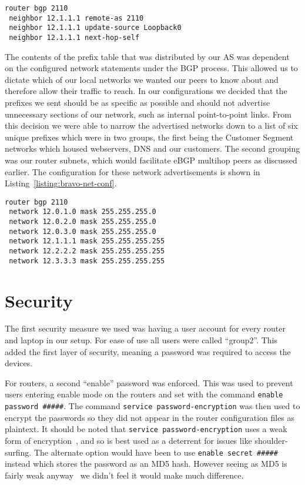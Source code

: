 \begin{lstlisting}[caption={Bravo-Alpha iBGP Configuration}, label={listing:bravo-ibgp-conf}]
router bgp 2110
 neighbor 12.1.1.1 remote-as 2110
 neighbor 12.1.1.1 update-source Loopback0
 neighbor 12.1.1.1 next-hop-self
\end{lstlisting}

The contents of the prefix table that was distributed by our AS was dependent
on the configured network statements under the BGP process. This allowed us to
dictate which of our local networks we wanted our peers to know about and
therefore allow their traffic to reach. In our configurations we decided that
the prefixes we sent should be as specific as possible and should not advertise
unnecessary sections of our network, such as internal point-to-point links.
From this decision we were able to narrow the advertised networks down to a
list of six unique prefixes which were in two groups, the first being the
Customer Segment networks which housed webservers, DNS and our customers. The
second grouping was our router subnets, which would facilitate eBGP multihop
peers as discussed earlier. The configuration for these network advertisements
is shown in Listing~\ref{listing:bravo-net-conf}.

\begin{lstlisting}[caption={Bravo BGP Network Configuration}, label={listing:bravo-net-conf}]
router bgp 2110
 network 12.0.1.0 mask 255.255.255.0
 network 12.0.2.0 mask 255.255.255.0
 network 12.0.3.0 mask 255.255.255.0
 network 12.1.1.1 mask 255.255.255.255
 network 12.2.2.2 mask 255.255.255.255
 network 12.3.3.3 mask 255.255.255.255
\end{lstlisting}

\section{Security}
The first security measure we used was having a user account for every router
and laptop in our setup. For ease of use all users were called ``group2''. This
added the first layer of security, meaning a password was required to access
the devices.

For routers, a second ``enable'' password was enforced. This was used to
prevent users entering enable mode on the routers and set with the command
\texttt{enable password \#\#\#\#\#}. The command \texttt{service password-encryption}
was then used to encrypt the passwords so they did not appear in
the router configuration files as plaintext. It should be noted that
\texttt{service password-encryption} uses a weak form of
encryption~\cite{ciscocracker}, and so is best used as a deterrent for issues
like shoulder-surfing. The alternate option would have been to use
\texttt{enable secret \#\#\#\#\#} instead which stores the password as an MD5
hash. However seeing as MD5 is fairly weak anyway~\cite{md5} we didn't feel it
would make much difference.

